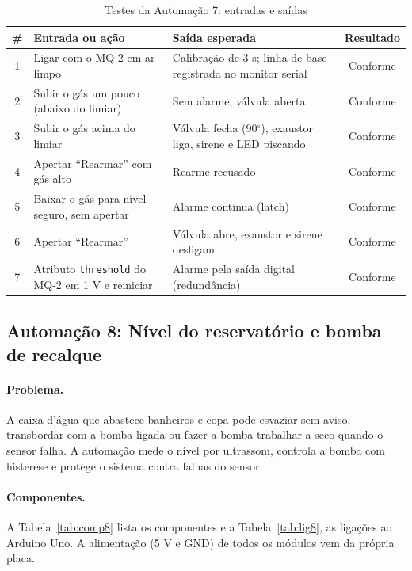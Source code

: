 \documentclass[12pt]{article}
\newcommand{\conf}{Conforme}
\begin{document}
\begin{table}[!htb]
\centering
\caption{Testes da Automação 7: entradas e saídas}\label{tab:teste7}
\small
\begin{tabularx}{\textwidth}{cXXc}
\toprule
\# & Entrada ou ação & Saída esperada & Resultado \\
\midrule
1 & Ligar com o MQ-2 em ar limpo & Calibração de 3 s; linha de base registrada no monitor serial & \conf \\
2 & Subir o gás um pouco (abaixo do limiar) & Sem alarme, válvula aberta & \conf \\
3 & Subir o gás acima do limiar & Válvula fecha (90$^\circ$), exaustor liga, sirene e LED piscando & \conf \\
4 & Apertar ``Rearmar'' com gás alto & Rearme recusado & \conf \\
5 & Baixar o gás para nível seguro, sem apertar & Alarme continua (latch) & \conf \\
6 & Apertar ``Rearmar'' & Válvula abre, exaustor e sirene desligam & \conf \\
7 & Atributo \texttt{threshold} do MQ-2 em 1 V e reiniciar & Alarme pela saída digital (redundância) & \conf \\
\bottomrule
\end{tabularx}
\end{table}



\subsection{Automação 8: Nível do reservatório e bomba de recalque}\label{sub:a8}

\paragraph{Problema.} A caixa d'água que abastece banheiros e copa pode esvaziar sem aviso, transbordar com a bomba ligada ou fazer a bomba trabalhar a seco quando o sensor falha. A automação mede o nível por ultrassom, controla a bomba com histerese e protege o sistema contra falhas do sensor.

\paragraph{Componentes.} A Tabela~\ref{tab:comp8} lista os componentes e a Tabela~\ref{tab:lig8}, as ligações ao Arduino Uno. A alimentação (5 V e GND) de todos os módulos vem da própria placa.
\end{document}
